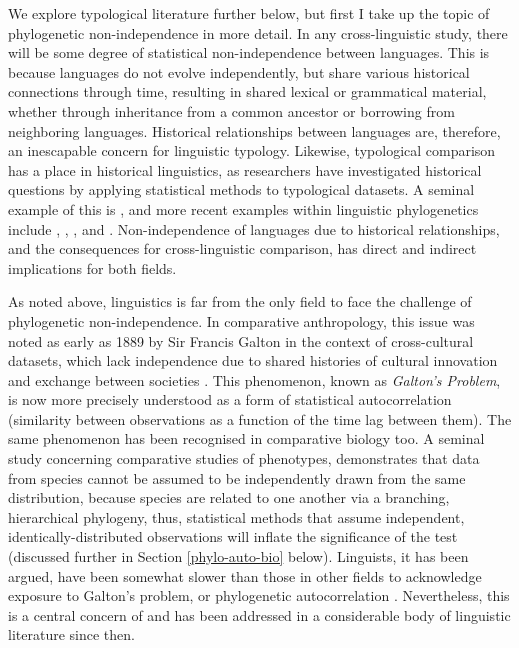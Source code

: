 We explore typological literature further below, but first I take up the topic of phylogenetic non-independence in more detail. In any cross-linguistic study, there will be some degree of statistical non-independence between languages. This is because languages do not evolve independently, but share various historical connections through time, resulting in shared lexical or grammatical material, whether through inheritance from a common ancestor or borrowing from neighboring languages. Historical relationships between languages are, therefore, an inescapable concern for linguistic typology. Likewise, typological comparison has a place in historical linguistics, as researchers have investigated historical questions by applying statistical methods to typological datasets. A seminal example of this is \textcite{nichols_linguistic_1992}, and more recent examples within linguistic phylogenetics include \textcite{dunn_structural_2005}, \textcite{dunn_structural_2008}, \textcite{rexova_cladistic_2006}, \textcite{reesink_explaining_2009} and \textcite{greenhill_evolutionary_2017}. Non-independence of languages due to historical relationships, and the consequences for cross-linguistic comparison, has direct and indirect implications for both fields.

As noted above, linguistics is far from the only field to face the challenge of phylogenetic non-independence. In comparative anthropology, this issue was noted as early as 1889 by Sir Francis Galton in the context of cross-cultural datasets, which lack independence due to shared histories of cultural innovation and exchange between societies \autocite[p.~15]{naroll_two_1961}. This phenomenon, known as \emph{Galton's Problem}, is now more precisely understood as a form of statistical autocorrelation (similarity between observations as a function of the time lag between them). The same phenomenon has been recognised in comparative biology too. A seminal study concerning comparative studies of phenotypes, \textcite{felsenstein_phylogenies_1985} demonstrates that data from species cannot be assumed to be independently drawn from the same distribution, because species are related to one another via a branching, hierarchical phylogeny, thus, statistical methods that assume independent, identically-distributed observations will inflate the significance of the test (discussed further in Section \ref{phylo-auto-bio} below). Linguists, it has been argued, have been somewhat slower than those in other fields to acknowledge exposure to Galton's problem, or phylogenetic autocorrelation \autocite[p.~293]{perkins_statistical_1989}. Nevertheless, this is a central concern of \textcite[p.~259]{dryer_large_1989} and has been addressed in a considerable body of linguistic literature since then.

